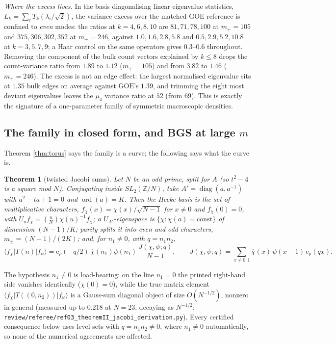 \documentclass[11pt,reqno]{amsart}
\newtheorem{theorem}{Theorem}[section]
\theoremstyle{definition}
\newcommand{\ZZ}{\mathbb{Z}}
\newcommand{\ep}{\mathrm{e}_p}
\newcommand{\GOE}{\mathrm{GOE}}
\begin{document}
\emph{Where the excess lives.}  In the basis diagonalising linear eigenvalue
statistics, $L_k=\sum_iT_k(\lambda_i/\sqrt2)$, the variance excess over the
matched $\GOE$ reference is confined to \emph{even} modes: the ratios at
$k=4,6,8,10$ are $81,71,78,100$ at $m_+=105$ and $375,306,302,352$ at
$m_+=246$, against $1.0,1.6,2.8,5.8$ and $0.5,2.9,5.2,10.8$ at
$k=3,5,7,9$; a Haar control on the same operators gives $0.3$--$0.6$
throughout.  Removing the component of the bulk count vectors explained by
$k\le8$ drops the count-variance ratio from $1.89$ to $1.12$ ($m_+=105$) and
from $3.82$ to $1.46$ ($m_+=246$).  The excess is not an edge effect: the
largest normalised eigenvalue sits at $1.35$ bulk edges on average against
$\GOE$'s $1.39$, and trimming the eight most deviant eigenvalues leaves the
$\mu_4$ variance ratio at $52$ (from $69$).  This is exactly the signature of
a one-parameter family of symmetric macroscopic densities.


\subsection{The family in closed form, and BGS at large
\texorpdfstring{$m$}{m}}\label{sub:r82b}

Theorem \ref{thm:torus} says the family is a curve; the following says what the
curve is.

\begin{theorem}[twisted Jacobi sums]\label{thm:jacobi}
Let $N$ be an odd prime, split for $A$ (so $t^2-4$ is a square mod $N$).
Conjugating inside $SL_2(\ZZ/N)$, take $A'=\operatorname{diag}(a,a^{-1})$ with
$a^2-ta+1=0$ and $\operatorname{ord}(a)=K$.  Then the Hecke basis is the set of
multiplicative characters, $f_\chi(x)=\chi(x)/\sqrt{N-1}$ for $x\neq0$ and
$f_\chi(0)=0$, with $U_uf_\chi=\left(\tfrac uN\right)\chi(u)^{-1}f_\chi$; a
$U_{A'}$-eigenspace is $\{\chi:\chi(a)=\text{const}\}$ of dimension $(N-1)/K$;
parity splits it into even and odd characters, $m_\pm=(N-1)/(2K)$; and, for
$n_1\neq0$, with $q=n_1n_2$,
\[
  \langle f_\chi|T(n)|f_\psi\rangle
  =\ep(-q/2)\,\overline{\chi}(n_1)\psi(n_1)\,
   \frac{J(\chi,\psi;q)}{N-1},
  \qquad
  J(\chi,\psi;q)=\sum_{x\neq0,1}\overline{\chi}(x)\,\psi(x-1)\,\ep(qx).
\]
\end{theorem}

The hypothesis $n_1\neq0$ is load-bearing: on the line $n_1=0$ the printed
right-hand side vanishes identically ($\overline{\chi}(0)=0$), while the true
matrix element $\langle f_\chi|T((0,n_2))|f_\psi\rangle$ is a Gauss-sum
diagonal object of size $O(N^{-1/2})$, nonzero in general (measured up to
$0.218$ at $N=23$, decaying as $N^{-1/2}$;
\texttt{review/referee/ref03\_theoremII\_jacobi\_derivation.py}).  Every
certified consequence below uses level sets with $q=n_1n_2\neq0$, where
$n_1\neq0$ automatically, so none of the numerical agreements are affected.
\end{document}
